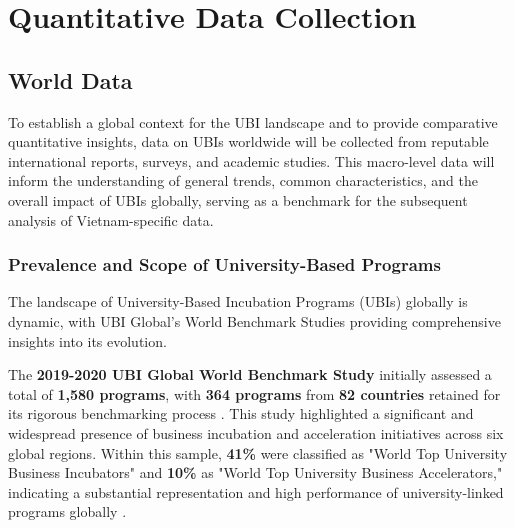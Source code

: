 \documentclass[../Main.tex]{subfiles}
\begin{document}
	\section{Quantitative Data Collection}
	\subsection{World Data}
	To establish a global context for the UBI landscape and to provide comparative quantitative insights, data on UBIs worldwide will be collected from reputable international reports, surveys, and academic studies. This macro-level data will inform the understanding of general trends, common characteristics, and the overall impact of UBIs globally, serving as a benchmark for the subsequent analysis of Vietnam-specific data.
	
	\subsubsection{Prevalence and Scope of University-Based Programs}
	The landscape of University-Based Incubation Programs (UBIs) globally is dynamic, with UBI Global's World Benchmark Studies providing comprehensive insights into its evolution.
	
	The \textbf{2019-2020 UBI Global World Benchmark Study} initially assessed a total of \textbf{1,580 programs}, with \textbf{364 programs} from \textbf{82 countries} retained for its rigorous benchmarking process \cite{ubi2019world}. This study highlighted a significant and widespread presence of business incubation and acceleration initiatives across six global regions. Within this sample, \textbf{41\%} were classified as "World Top University Business Incubators" and \textbf{10\%} as "World Top University Business Accelerators," indicating a substantial representation and high performance of university-linked programs globally \cite{ubi2019world}.
	
\end{document}
